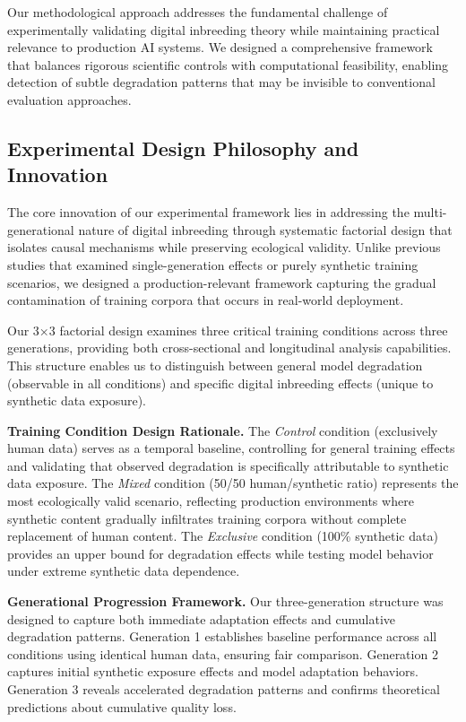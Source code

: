 \documentclass{article}
\begin{document}
Our methodological approach addresses the fundamental challenge of experimentally validating digital inbreeding theory while maintaining practical relevance to production AI systems. We designed a comprehensive framework that balances rigorous scientific controls with computational feasibility, enabling detection of subtle degradation patterns that may be invisible to conventional evaluation approaches.

\subsection{Experimental Design Philosophy and Innovation}

The core innovation of our experimental framework lies in addressing the multi-generational nature of digital inbreeding through systematic factorial design that isolates causal mechanisms while preserving ecological validity. Unlike previous studies that examined single-generation effects or purely synthetic training scenarios, we designed a production-relevant framework capturing the gradual contamination of training corpora that occurs in real-world deployment.

Our 3×3 factorial design examines three critical training conditions across three generations, providing both cross-sectional and longitudinal analysis capabilities. This structure enables us to distinguish between general model degradation (observable in all conditions) and specific digital inbreeding effects (unique to synthetic data exposure).

\textbf{Training Condition Design Rationale.} The \textit{Control} condition (exclusively human data) serves as a temporal baseline, controlling for general training effects and validating that observed degradation is specifically attributable to synthetic data exposure. The \textit{Mixed} condition (50/50 human/synthetic ratio) represents the most ecologically valid scenario, reflecting production environments where synthetic content gradually infiltrates training corpora without complete replacement of human content. The \textit{Exclusive} condition (100\% synthetic data) provides an upper bound for degradation effects while testing model behavior under extreme synthetic data dependence.

\textbf{Generational Progression Framework.} Our three-generation structure was designed to capture both immediate adaptation effects and cumulative degradation patterns. Generation 1 establishes baseline performance across all conditions using identical human data, ensuring fair comparison. Generation 2 captures initial synthetic exposure effects and model adaptation behaviors. Generation 3 reveals accelerated degradation patterns and confirms theoretical predictions about cumulative quality loss.
\end{document}

